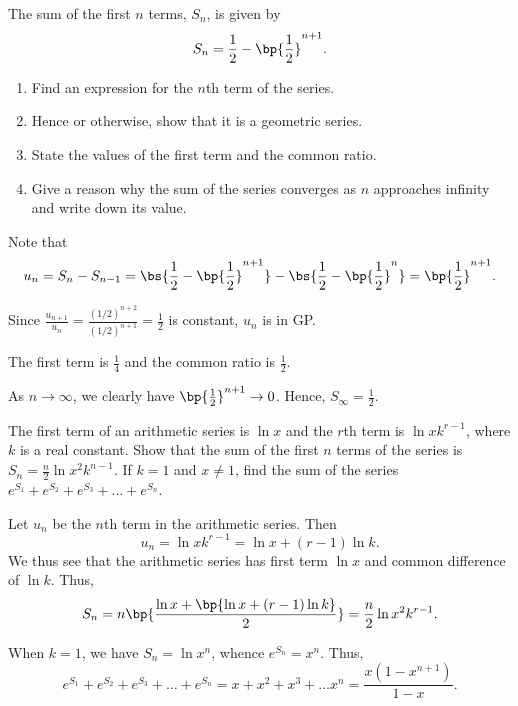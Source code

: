 \begin{problem}
    The sum of the first $n$ terms, $S_n$, is given by \[S_n = \frac12 - \bp{\frac12}^{n+1}.\]
    
    \begin{enumerate}
        \item Find an expression for the $n$th term of the series.
        \item Hence or otherwise, show that it is a geometric series.
        \item State the values of the first term and the common ratio.
        \item Give a reason why the sum of the series converges as $n$ approaches infinity and write down its value.
    \end{enumerate}
\end{problem}
\begin{solution}
    \begin{ppart}
        Note that \[u_n = S_n - S_{n-1} = \bs{\frac12 - \bp{\frac12}^{n+1}} - \bs{\frac12 - \bp{\frac12}^{n}} = \bp{\frac12}^{n+1}.\]
    \end{ppart}
    \begin{ppart}
        Since $\frac{u_{n+1}}{u_n} = \frac{(1/2)^{n+2}}{(1/2)^{n+1}} = \frac12$ is constant, $u_n$ is in GP.
    \end{ppart}
    \begin{ppart}
        The first term is $\frac14$ and the common ratio is $\frac12$.
    \end{ppart}
    \begin{ppart}
        As $n \to \infty$, we clearly have $\bp{\frac12}^{n+1} \to 0$. Hence, $S_\infty = \frac12$.
    \end{ppart}
\end{solution}

\begin{problem}
    The first term of an arithmetic series is $\ln x$ and the $r$th term is $\ln{xk^{r-1}}$, where $k$ is a real constant. Show that the sum of the first $n$ terms of the series is $S_n = \frac{n}2 \ln{x^2k^{n-1}}$. If $k = 1$ and $x \neq 1$, find the sum of the series $e^{S_1} + e^{S_2} + e^{S_3} + \ldots + e^{S_n}$.
\end{problem}
\begin{solution}
    Let $u_n$ be the $n$th term in the arithmetic series. Then \[u_n = \ln{xk^{r-1}} = \ln x + (r-1)\ln k.\] We thus see that the arithmetic series has first term $\ln x$ and common difference of $\ln k$. Thus, \[S_n = n\bp{\frac{\ln x + \bp{\ln x + (r-1)\ln k}}{2}} = \frac{n}{2} \ln{x^2 k^{r-1}}.\]

    When $k = 1$, we have $S_n = \ln{x^n}$, whence $e^{S_n} = x^n$. Thus, \[e^{S_1} + e^{S_2} + e^{S_3} + \ldots + e^{S_n} = x + x^2 + x^3 + \ldots x^n = \frac{x(1-x^{n+1})}{1-x}.\]
\end{solution}

